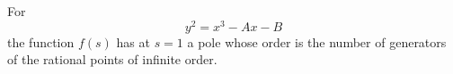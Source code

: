 \begin{proposition}\label{eq:190}
    For
\[
    y^2=x^3-Ax-B
\]
    the function $f(s)$ has at $s=1$ a pole whose order is the number of generators of the rational points of infinite order.
\end{proposition}
